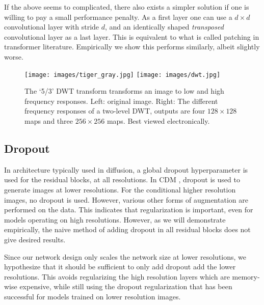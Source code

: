 If the above seems to complicated, there also exists a simpler solution if one is willing to pay a small performance penalty. As a first layer one can use a $d \times d$ convolutional layer with stride $d$, and an identically shaped \textit{transposed} convolutional layer as a last layer. This is equivalent to what is called patching in transformer literature. Empirically we show this performs similarly, albeit slightly worse.

\begin{figure}
    \centering
    \texttt{[image: images/tiger\_gray.jpg]}\hfill
    \texttt{[image: images/dwt.jpg]}
    \caption{The `5/3' DWT transform transforms an image to low and high frequency responses. Left: original image. Right: The different frequency responses of a two-level DWT, outputs are four $128 \times 128$ maps and three $256 \times 256$ maps. Best viewed electronically.} \vspace{-.6cm}
    \label{fig:dwt}
    \vspace{-.2cm}
\end{figure}

\subsection{Dropout}
In architecture typically used in diffusion, a global dropout hyperparameter is used for the residual blocks, at all resolutions. In CDM \citep{ho2022cascaded}, dropout is used to generate images at lower resolutions. For the conditional higher resolution images, no dropout is used. However, various other forms of augmentation are performed on the data. This indicates that regularization is important, even for models operating on high resolutions. However, as we will demonstrate empirically, the naive method of adding dropout in all residual blocks does not give desired results. 

Since our network design only scales the network size at lower resolutions, we hypothesize that it should be sufficient to only add dropout add the lower resolutions. This avoids regularizing the high resolution layers which are memory-wise expensive, while still using the dropout regularization that has been successful for models trained on lower resolution images.

